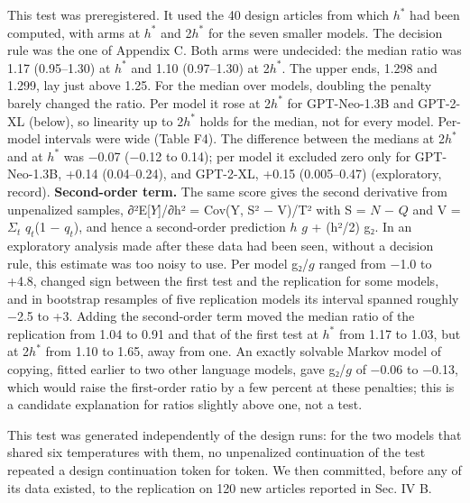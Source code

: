 \documentclass[aps,prx,onecolumn,superscriptaddress,longbibliography]{revtex4-2}
\begin{document}
This test was preregistered. It used the 40 design articles from which \(h^*\) had been computed, with arms at \(h^*\) and 2\(h^*\) for the seven smaller models. The decision rule was the one of Appendix C. Both arms were undecided: the median ratio was 1.17 (0.95--1.30) at \(h^*\) and 1.10 (0.97--1.30) at 2\(h^*\). The upper ends, 1.298 and 1.299, lay just above 1.25. For the median over models, doubling the penalty barely changed the ratio. Per model it rose at 2\(h^*\) for GPT-Neo-1.3B and GPT-2-XL (below), so linearity up to 2\(h^*\) holds for the median, not for every model. Per-model intervals were wide (Table F4). The difference between the medians at 2\(h^*\) and at \(h^*\) was −0.07 (−0.12 to 0.14); per model it excluded zero only for GPT-Neo-1.3B, +0.14 (0.04--0.24), and GPT-2-XL, +0.15 (0.005--0.47) (exploratory, record). \textbf{Second-order term.} The same score gives the second derivative from unpenalized samples, ∂²E{[}\(Y\){]}/∂h² = Cov(Y, S² − V)/T² with S = \(N\) − \(Q\) and V = \(\Sigma_{t}\) \(q_{t}\)(1 − \(q_{t}\)), and hence a second-order prediction \(h\) \(g\) + (h²/2) g₂. In an exploratory analysis made after these data had been seen, without a decision rule, this estimate was too noisy to use. Per model g₂/\(g\) ranged from −1.0 to +4.8, changed sign between the first test and the replication for some models, and in bootstrap resamples of five replication models its interval spanned roughly −2.5 to +3. Adding the second-order term moved the median ratio of the replication from 1.04 to 0.91 and that of the first test at \(h^*\) from 1.17 to 1.03, but at 2\(h^*\) from 1.10 to 1.65, away from one. An exactly solvable Markov model of copying, fitted earlier to two other language models, gave g₂/\(g\) of −0.06 to −0.13, which would raise the first-order ratio by a few percent at these penalties; this is a candidate explanation for ratios slightly above one, not a test.

This test was generated independently of the design runs: for the two models that shared six temperatures with them, no unpenalized continuation of the test repeated a design continuation token for token. We then committed, before any of its data existed, to the replication on 120 new articles reported in Sec. IV B.
\end{document}
